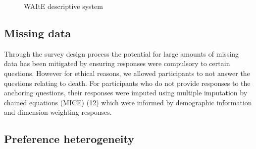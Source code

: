 \documentclass[
  letterpaper,
  DIV=11,
  numbers=noendperiod]{scrartcl}
\begin{document}
\begin{figure}


\caption{\label{fig-waite-descriptive}WAItE descriptive system}

\end{figure}%

\subsection{Missing data}\label{missing-data}

Through the survey design process the potential for large amounts of
missing data has been mitigated by ensuring responses were compulsory to
certain questions. However for ethical reasons, we allowed participants
to not answer the questions relating to death. For participants who do
not provide responses to the anchoring questions, their responses were
imputed using multiple imputation by chained equations (MICE) (12) which
were informed by demographic information and dimension weighting
responses.

\subsection{Preference heterogeneity}\label{preference-heterogeneity}
\end{document}
